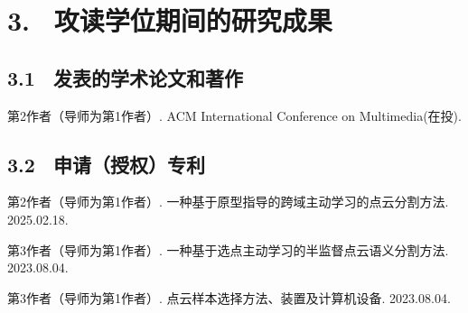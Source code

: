 \section{3. \ 攻读学位期间的研究成果}
\subsection{3.1 \ 发表的学术论文和著作}
\noindent [1]
\begin{minipage}[t]{0.96\linewidth}
第2作者（导师为第1作者）. ACM International Conference on Multimedia(在投).
\end{minipage}
\vspace{0cm}

\subsection{3.2 \ 申请（授权）专利}
\noindent [1]
\begin{minipage}[t]{0.96\linewidth}
第2作者（导师为第1作者）. 一种基于原型指导的跨域主动学习的点云分割方法. 2025.02.18.
\end{minipage}
\noindent [2]
\begin{minipage}[t]{0.96\linewidth}
第3作者（导师为第1作者）. 一种基于选点主动学习的半监督点云语义分割方法. 2023.08.04.
\end{minipage}
\noindent [3]
\begin{minipage}[t]{0.96\linewidth}
第3作者（导师为第1作者）. 点云样本选择方法、装置及计算机设备. 2023.08.04.
\end{minipage}

